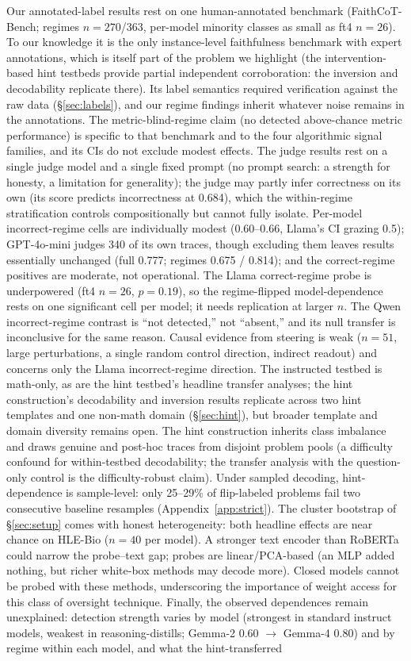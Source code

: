 \documentclass{article}
\begin{document}
Our annotated-label results rest on one human-annotated benchmark (FaithCoT-Bench; regimes $n{=}270$/$363$, per-model minority classes as small as ft4 $n{=}26$). To our knowledge it is the only instance-level faithfulness benchmark with expert annotations, which is itself part of the problem we highlight (the intervention-based hint testbeds provide partial independent corroboration: the inversion and decodability replicate there). Its label semantics required verification against the raw data (\S\ref{sec:labels}), and our regime findings inherit whatever noise remains in the annotations. The metric-blind-regime claim (no detected above-chance metric performance) is specific to that benchmark and to the four algorithmic signal families, and its CIs do not exclude modest effects. The judge results rest on a single judge model and a single fixed prompt (no prompt search: a strength for honesty, a limitation for generality); the judge may partly infer correctness on its own (its score predicts incorrectness at 0.684), which the within-regime stratification controls compositionally but cannot fully isolate. Per-model incorrect-regime cells are individually modest (0.60--0.66, Llama's CI grazing 0.5); GPT-4o-mini judges 340 of its own traces, though excluding them leaves results essentially unchanged (full 0.777; regimes 0.675 / 0.814); and the correct-regime positives are moderate, not operational. The Llama correct-regime probe is underpowered (ft4 $n{=}26$, $p{=}0.19$), so the regime-flipped model-dependence rests on one significant cell per model; it needs replication at larger $n$. The Qwen incorrect-regime contrast is ``not detected,'' not ``absent,'' and its null transfer is inconclusive for the same reason. Causal evidence from steering is weak ($n{=}51$, large perturbations, a single random control direction, indirect readout) and concerns only the Llama incorrect-regime direction. The instructed testbed is math-only, as are the hint testbed's headline transfer analyses; the hint construction's decodability and inversion results replicate across two hint templates and one non-math domain (\S\ref{sec:hint}), but broader template and domain diversity remains open. The hint construction inherits class imbalance and draws genuine and post-hoc traces from disjoint problem pools (a difficulty confound for within-testbed decodability; the transfer analysis with the question-only control is the difficulty-robust claim). Under sampled decoding, hint-dependence is sample-level: only 25--29\% of flip-labeled problems fail two consecutive baseline resamples (Appendix~\ref{app:strict}). The cluster bootstrap of \S\ref{sec:setup} comes with honest heterogeneity: both headline effects are near chance on HLE-Bio ($n{=}40$ per model). A stronger text encoder than RoBERTa could narrow the probe--text gap; probes are linear/PCA-based (an MLP added nothing, but richer white-box methods may decode more). Closed models cannot be probed with these methods, underscoring the importance of weight access for this class of oversight technique. Finally, the observed dependences remain unexplained: detection strength varies by model (strongest in standard instruct models, weakest in reasoning-distills; Gemma-2 0.60 $\to$ Gemma-4 0.80) and by regime within each model, and what the hint-transferred 
\end{document}
